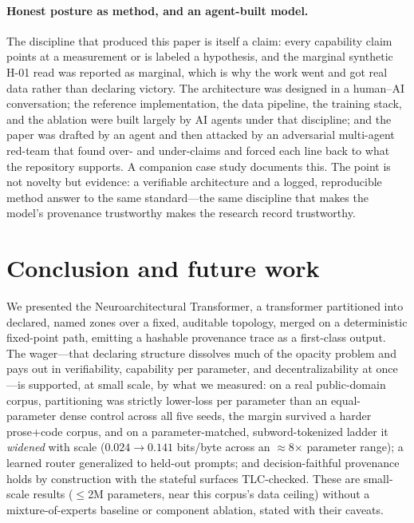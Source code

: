 \documentclass[11pt]{article}
\begin{document}
\paragraph{Honest posture as method, and an agent-built model.}
The discipline that produced this paper is itself a claim: every capability claim points at a
measurement or is labeled a hypothesis, and the marginal synthetic H-01 read was reported as marginal,
which is why the work went and got real data rather than declaring victory. The architecture was
designed in a human--AI conversation; the reference implementation, the data pipeline, the training
stack, and the ablation were built largely by AI agents under that discipline; and the paper was
drafted by an agent and then attacked by an adversarial multi-agent red-team that found over- and
under-claims and forced each line back to what the repository supports. A companion case study
documents this. The point is not novelty but evidence: a verifiable architecture and a logged,
reproducible method answer to the same standard---the same discipline that makes the model's
provenance trustworthy makes the research record trustworthy.

\section{Conclusion and future work}\label{sec:concl}

We presented the Neuroarchitectural Transformer, a transformer partitioned into declared, named zones
over a fixed, auditable topology, merged on a deterministic fixed-point path, emitting a hashable
provenance trace as a first-class output. The wager---that declaring structure dissolves much of the
opacity problem and pays out in verifiability, capability per parameter, and decentralizability at
once---is supported, at small scale, by what we measured: on a real public-domain corpus, partitioning was
strictly lower-loss per parameter than an equal-parameter dense control across all five seeds, the
margin survived a harder prose+code corpus, and on a parameter-matched, subword-tokenized ladder it
\emph{widened} with scale ($0.024\to0.141$ bits/byte across an $\approx$8$\times$ parameter range); a
learned router generalized to held-out prompts; and decision-faithful provenance holds by
construction with the stateful surfaces TLC-checked. These are small-scale results ($\le$2M
parameters, near this corpus's data ceiling) without a mixture-of-experts baseline or component
ablation, stated with their caveats.
\end{document}
